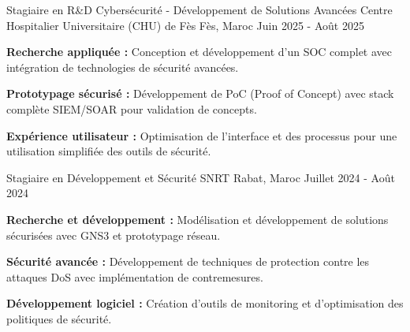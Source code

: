 
\begin{cventries}

    \cventry
    {Stagiaire en R\&D Cybersécurité - Développement de Solutions Avancées} %
    {Centre Hospitalier Universitaire (CHU) de Fès} %
    {Fès, Maroc} %
    {Juin 2025 - Août 2025} %
    {
        \begin{cvitems}
            \item {
                        \textbf{Recherche appliquée :} Conception et développement d'un SOC complet avec intégration de technologies de sécurité avancées.}
            \item {
                        \textbf{Prototypage sécurisé :} Développement de PoC (Proof of Concept) avec stack complète SIEM/SOAR pour validation de concepts.}
            \item {
                        \textbf{Expérience utilisateur :} Optimisation de l'interface et des processus pour une utilisation simplifiée des outils de sécurité.}
        \end{cvitems}
    }

    \cventry
    {Stagiaire en Développement et Sécurité} %
    {SNRT} %
    {Rabat, Maroc} %
    {Juillet 2024 - Août 2024} %
    {
        \begin{cvitems} %
            \item {\textbf{Recherche et développement :} Modélisation et développement de solutions sécurisées avec GNS3 et prototypage réseau.}
            \item {\textbf{Sécurité avancée :} Développement de techniques de protection contre les attaques DoS avec implémentation de contremesures.}
            \item {\textbf{Développement logiciel :} Création d'outils de monitoring et d'optimisation des politiques de sécurité.}
        \end{cvitems}
    }

\end{cventries}